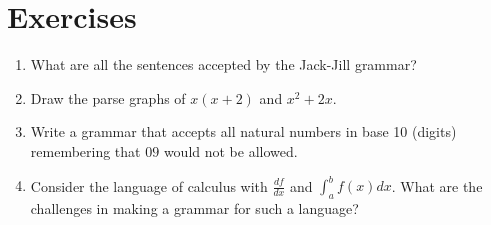 \section*{Exercises}
\begin{enumerate}
\item What are all the sentences accepted by the Jack-Jill grammar?
\item Draw the parse graphs of $x(x+2)$ and $x^2+2x$.
\item Write a grammar that accepts all natural numbers in base 10 (digits) 
remembering that $09$ would not be allowed.
\item Consider the language of calculus with $\frac{df}{dx}$ and $\int_a^b f(x)dx$.
What are the challenges in making a grammar for such a language?
\end{enumerate}